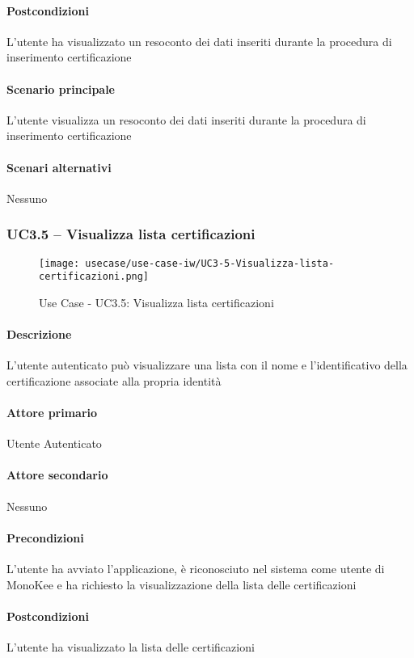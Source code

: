 \paragraph{Postcondizioni}  L’utente ha visualizzato un resoconto dei dati inseriti durante la procedura di inserimento certificazione
\paragraph{Scenario principale}  
L’utente visualizza un resoconto dei dati inseriti durante la procedura di inserimento certificazione
\paragraph{Scenari alternativi}  Nessuno






\subsubsection{UC3.5 – Visualizza lista certificazioni}
\begin{figure}[!htbp] 
    \centering 
    \texttt{[image: usecase/use-case-iw/UC3-5-Visualizza-lista-certificazioni.png]} 
    \caption{Use Case - UC3.5: Visualizza lista certificazioni}
\end{figure}

\paragraph{Descrizione}  L’utente autenticato può visualizzare una lista con il nome e l’identificativo della certificazione associate alla propria identità
\paragraph{Attore primario}  Utente Autenticato
\paragraph{Attore secondario}  Nessuno
\paragraph{Precondizioni}  L’utente ha avviato l’applicazione, è riconosciuto nel sistema come utente di MonoKee e ha richiesto la visualizzazione della lista delle certificazioni
\paragraph{Postcondizioni}  L’utente ha visualizzato la lista delle certificazioni

